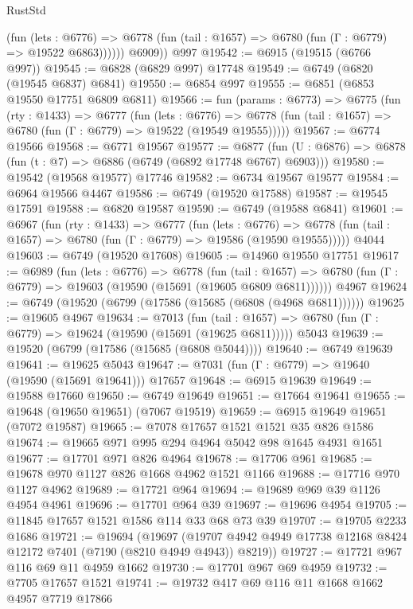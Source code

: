 \begin{lexlean}{RustStd}
\begin{coremodule}
              (fun (lets : @6776) =>
              @6778 (fun (tail : @1657) => @6780 (fun (Γ : @6779) => @19522 @6863))))))
        @6909))
    @997
@19542 := @6915 (@19515 (@6766 @997))
@19545 := @6828 (@6829 @997) @17748
@19549 := @6749 (@6820 (@19545 @6837) @6841)
@19550 := @6854 @997
@19555 := @6851 (@6853 @19550 @17751 @6809 @6811)
@19566 := fun (params : @6773) =>
  @6775
    (fun (rty : @1433) =>
    @6777
      (fun (lets : @6776) =>
      @6778 (fun (tail : @1657) => @6780 (fun (Γ : @6779) => @19522 (@19549 @19555)))))
@19567 := @6774 @19566
@19568 := @6771 @19567
@19577 := @6877
    (fun (U : @6876) => @6878 (fun (t : @7) => @6886 (@6749 (@6892 @17748 @6767) @6903)))
@19580 := @19542 (@19568 @19577) @17746
@19582 := @6734 @19567 @19577
@19584 := @6964 @19566 @4467
@19586 := @6749 (@19520 @17588)
@19587 := @19545 @17591
@19588 := @6820 @19587
@19590 := @6749 (@19588 @6841)
@19601 := @6967
    (fun (rty : @1433) =>
    @6777
      (fun (lets : @6776) =>
      @6778 (fun (tail : @1657) => @6780 (fun (Γ : @6779) => @19586 (@19590 @19555)))))
    @4044
@19603 := @6749 (@19520 @17608)
@19605 := @14960 @19550 @17751
@19617 := @6989
    (fun (lets : @6776) =>
    @6778
      (fun (tail : @1657) =>
      @6780 (fun (Γ : @6779) => @19603 (@19590 (@15691 (@19605 @6809 @6811))))))
    @4967
@19624 := @6749 (@19520 (@6799 (@17586 (@15685 (@6808 (@4968 @6811))))))
@19625 := @19605 @4967
@19634 := @7013
    (fun (tail : @1657) => @6780 (fun (Γ : @6779) => @19624 (@19590 (@15691 (@19625 @6811)))))
    @5043
@19639 := @19520 (@6799 (@17586 (@15685 (@6808 @5044))))
@19640 := @6749 @19639
@19641 := @19625 @5043
@19647 := @7031 (fun (Γ : @6779) => @19640 (@19590 (@15691 @19641))) @17657
@19648 := @6915 @19639
@19649 := @19588 @17660
@19650 := @6749 @19649
@19651 := @17664 @19641
@19655 := @19648 (@19650 @19651) (@7067 @19519)
@19659 := @6915 @19649 @19651 (@7072 @19587)
@19665 := @7078 @17657 @1521 @1521 @35 @826 @1586
@19674 := @19665 @971 @995 @294 @4964 @5042 @98 @1645 @4931 @1651
@19677 := @17701 @971 @826 @4964
@19678 := @17706 @961
@19685 := @19678 @970 @1127 @826 @1668 @4962 @1521 @1166
@19688 := @17716 @970 @1127 @4962
@19689 := @17721 @964
@19694 := @19689 @969 @39 @1126 @4954 @4961
@19696 := @17701 @964 @39
@19697 := @19696 @4954
@19705 := @11845 @17657 @1521 @1586 @114 @33 @68 @73 @39
@19707 := @19705 @2233 @1686
@19721 := @19694
    (@19697 (@19707 @4942 @4949 @17738 @12168 @8424 @12172 @7401 (@7190 (@8210 @4949 @4943)) @8219))
@19727 := @17721 @967 @116 @69 @11 @4959 @1662
@19730 := @17701 @967 @69 @4959
@19732 := @7705 @17657 @1521
@19741 := @19732 @417 @69 @116 @11 @1668 @1662 @4957 @7719 @17866

\end{coremodule}
\end{lexlean}
